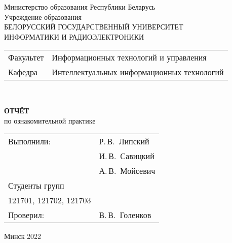 \begin{titlepage}
  \begin{center}
    Министерство образования Республики Беларусь\\[1em]
    Учреждение образования\\
    БЕЛОРУССКИЙ ГОСУДАРСТВЕННЫЙ УНИВЕРСИТЕТ \\
    ИНФОРМАТИКИ И РАДИОЭЛЕКТРОНИКИ\\[1em]

    \begin{minipage}{\textwidth}
      \begin{flushleft}
        \begin{tabular}{ l l }
          Факультет & Информационных технологий и управления\\
          Кафедра   & Интеллектуальных информационных технологий
        \end{tabular}
      \end{flushleft}
    \end{minipage}\\[1em]

    \vspace{5em}


    \textbf{ОТЧЁТ}\\
    
    {по ознакомительной практике}\\
    \vspace{10em}
    
    \begin{tabular}{ p{}p{} }
      Выполнили:& Р.\,В.~Липский \\
               & И.\,В.~Савицкий\\
               & А.\,В.~Мойсевич\\[1em]
      Студенты групп& \\
      121701, 121702, 121703 & \\
      Проверил: & В.\,В.~Голенков \\
     
    \end{tabular}
    
    \vfill
    {\normalsize Минск 2022}
  \end{center}
\end{titlepage}
